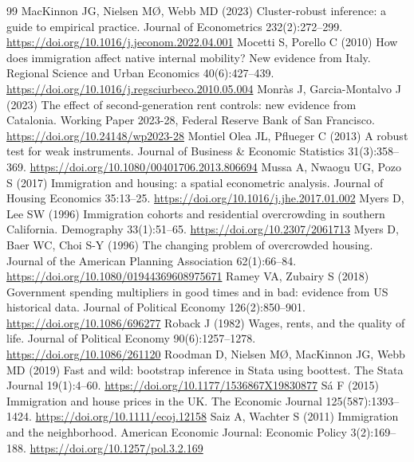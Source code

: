 \begin{thebibliography}{99}
 MacKinnon JG, Nielsen MØ, Webb MD (2023) Cluster-robust inference: a guide to empirical practice. Journal of Econometrics 232(2):272--299. \url{https://doi.org/10.1016/j.jeconom.2022.04.001}
 Mocetti S, Porello C (2010) How does immigration affect native internal mobility? New evidence from Italy. Regional Science and Urban Economics 40(6):427--439. \url{https://doi.org/10.1016/j.regsciurbeco.2010.05.004}
 Monràs J, Garcia-Montalvo J (2023) The effect of second-generation rent controls: new evidence from Catalonia. Working Paper 2023-28, Federal Reserve Bank of San Francisco. \url{https://doi.org/10.24148/wp2023-28}
 Montiel Olea JL, Pflueger C (2013) A robust test for weak instruments. Journal of Business \& Economic Statistics 31(3):358--369. \url{https://doi.org/10.1080/00401706.2013.806694}
 Mussa A, Nwaogu UG, Pozo S (2017) Immigration and housing: a spatial econometric analysis. Journal of Housing Economics 35:13--25. \url{https://doi.org/10.1016/j.jhe.2017.01.002}
 Myers D, Lee SW (1996) Immigration cohorts and residential overcrowding in southern California. Demography 33(1):51--65. \url{https://doi.org/10.2307/2061713}
 Myers D, Baer WC, Choi S-Y (1996) The changing problem of overcrowded housing. Journal of the American Planning Association 62(1):66--84. \url{https://doi.org/10.1080/01944369608975671}
 Ramey VA, Zubairy S (2018) Government spending multipliers in good times and in bad: evidence from US historical data. Journal of Political Economy 126(2):850--901. \url{https://doi.org/10.1086/696277}
 Roback J (1982) Wages, rents, and the quality of life. Journal of Political Economy 90(6):1257--1278. \url{https://doi.org/10.1086/261120}
 Roodman D, Nielsen MØ, MacKinnon JG, Webb MD (2019) Fast and wild: bootstrap inference in Stata using boottest. The Stata Journal 19(1):4--60. \url{https://doi.org/10.1177/1536867X19830877}
 Sá F (2015) Immigration and house prices in the UK. The Economic Journal 125(587):1393--1424. \url{https://doi.org/10.1111/ecoj.12158}
 Saiz A, Wachter S (2011) Immigration and the neighborhood. American Economic Journal: Economic Policy 3(2):169--188. \url{https://doi.org/10.1257/pol.3.2.169}

\end{thebibliography}
